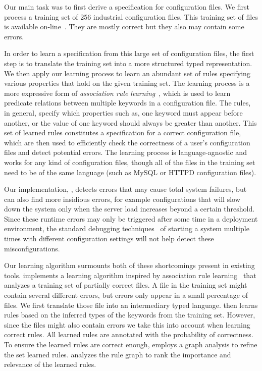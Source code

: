 Our main task was to first derive a specification for configuration 
files. We first process a training set of 256 industrial configuration files. This training set of files is
available on-line~\cite{configdataset}. They are mostly correct
but they also may contain some errors.

In order to learn a specification from this large set of configuration
files,
the first step is to 
translate the training set into a more structured typed representation.
We then apply our learning process to learn an abundant set of rules 
specifying various properties that hold on the given training set. 
The learning process is a more expressive form of \textit{association rule learning}~\cite{agrawal1993mining}, which is used to learn predicate relations between multiple keywords in a configuration file.
The rules, in general, specify which properties such as, one keyword must appear before another, or the value of one keyword should always be greater than another.
This set of learned rules constitutes a specification for a correct configuration file,
which are then used to efficiently check the correctness of a user's configuration files and detect 
potential errors. 
The learning process is language-agnostic and works for any kind 
of configuration files, though all of the files in the training set need to be of 
the same language (such as MySQL or HTTPD configuration files).



Our implementation, \app, detects errors that may cause total system failures, but can also find more insidious errors, for example configurations that will slow down the system only when the server load increases beyond a certain threshold.
Since these runtime errors may only be triggered after some time in a deployment environment, the standard debugging techniques~\cite{Zeller:2005:WPF:1077048} of starting a system multiple times with different configuration settings will not help detect these misconfigurations.



Our learning algorithm surmounts both of these shortcomings present in 
existing tools. \app implements a learning
algorithm inspired by association rule
learning~\cite{agrawal1993mining} that analyzes a training set of partially correct files.
A file in the training set might contain several different errors, but errors only appear 
in a small percentage of files. 
We first translate those file into an intermediary typed language.
\app then learns rules based on the inferred types of the keywords from the training set.
However, since the files might also contain errors we take 
this into account when learning correct rules. All learned rules are 
annotated with the probability of correctness.  
To ensure the learned rules are correct enough,
\app employs a graph analysis to refine the set learned rules.
\app analyzes the rule graph to rank the importance and relevance of the learned rules. 

